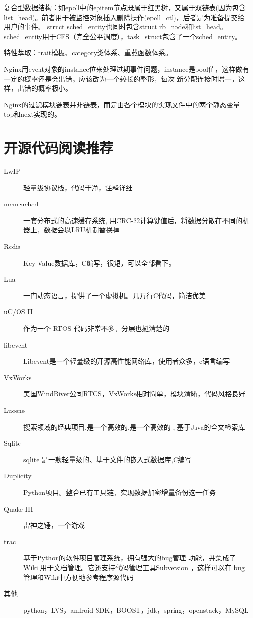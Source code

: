 复合型数据结构：如epoll中的epitem节点既属于红黑树，又属于双链表(因为包含list\_head)。前者用于被监控对象插入删除操作(epoll\_ctl)，后者是为准备提交给用户的事件。
struct sched\_entity也同时包含struct rb\_node和list\_head。sched\_entity用于CFS（完全公平调度），task\_struct包含了一个sched\_entity。

特性萃取：trait模板、category类体系、重载函数体系。

Nginx用event对象的instance位来处理过期事件问题，instance是bool值，这样做有一定的概率还是会出错，应该改为一个较长的整形，每次
新分配连接时增一，这样，出错的概率极小。

Nginx的过滤模块链表并非链表，而是由各个模块的实现文件中的两个静态变量top和next实现的。




\section{开源代码阅读推荐}
\begin{description}
\item [LwIP] 轻量级协议栈，代码干净，注释详细
\item [memcached] 一套分布式的高速缓存系统, 用CRC-32计算键值后，将数据分散在不同的机器上，数据会以LRU机制替换掉
\item [Redis] Key-Value数据库，C编写，很短，可以全部看下。
\item [Lua] 一门动态语言，提供了一个虚拟机。几万行C代码，简洁优美
\item [uC/OS II]作为一个 RTOS 代码非常不多，分层也挺清楚的
\item [libevent] Libevent是一个轻量级的开源高性能网络库，使用者众多，c语言编写
\item [VxWorks] 美国WindRiver公司RTOS，VxWorks相对简单，模块清晰，代码风格良好
\item [Lucene] 搜索领域的经典项目,是一个高效的,是一个高效的 , 基于Java的全文检索库
\item [Sqlite] sqlite 是一款轻量级的、基于文件的嵌入式数据库,C编写
\item [Duplicity] Python项目。整合已有工具链，实现数据加密增量备份这一任务
\item [Quake III]雷神之锤，一个游戏
\item [trac] 基于Python的软件项目管理系统，拥有强大的bug管理 功能，并集成了Wiki 用于文档管理。它还支持代码管理工具Subversion ，这样可以在 bug管理和Wiki中方便地参考程序源代码
\item [其他] python，LVS，android SDK，BOOST，jdk，spring，openstack，MySQL
\end{description}


















